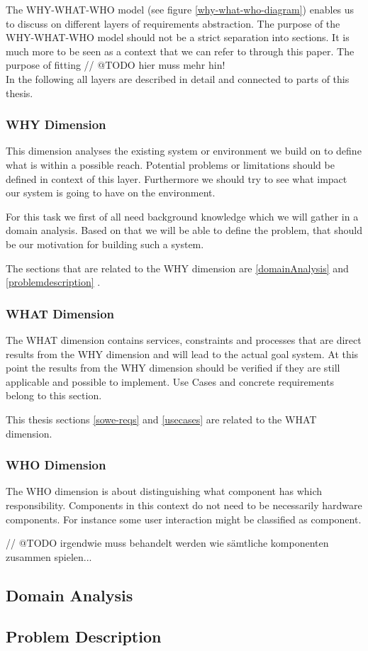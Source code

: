 The WHY-WHAT-WHO model (see figure \ref{why-what-who-diagram}) enables us to discuss on different layers of requirements abstraction. The purpose of the WHY-WHAT-WHO model should not be a strict separation into sections. It is much more to be seen as a context that we can refer to through this paper.
The purpose of fitting 
// @TODO hier muss mehr hin! \\

In the following all layers are described in detail and connected to parts of this thesis. 

\subsubsection*{WHY Dimension}
This dimension analyses the existing system or environment 
we build on to define what is within a possible reach. Potential problems or limitations should be defined in context of this layer. Furthermore we should try to see what impact our system is going to have on the environment. 

For this task we first of all need background knowledge which we will gather in a domain analysis. Based on that we will be able to define the problem, that should be our motivation for building such a system. 

The sections that are related to the WHY dimension are \ref{domainAnalysis}  and \ref{problemdescription} .

\subsubsection*{WHAT Dimension}

The WHAT dimension contains services, constraints and processes that are direct results from the WHY dimension and will lead to the actual goal system. At this point the results from the WHY dimension should be verified if they are still applicable and possible to implement. Use Cases and concrete requirements belong to this section. 

This thesis sections \ref{sowe-reqs}  and \ref{usecases}  are related to the WHAT dimension.

\subsubsection*{WHO Dimension}

The WHO dimension is about distinguishing what component has which responsibility. Components in this context do not need to be necessarily hardware components. For instance some user interaction might be classified as component.

// @TODO irgendwie muss behandelt werden wie sämtliche komponenten zusammen spielen... \\

\subsection{Domain Analysis}


\subsection{Problem Description}




